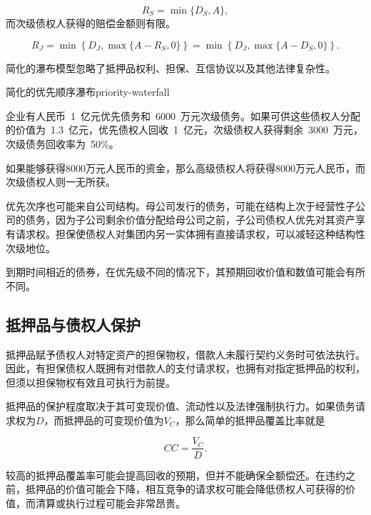 \begin{equation}
R_S=\min\{D_S,A\},
\label{eq:ch8-senior-recovery}
\end{equation}
而次级债权人获得的赔偿金额则有限。

\begin{equation}
R_J
=
\min\left\{D_J,\max\{A-R_S,0\}\right\}
=
\min\left\{D_J,\max\{A-D_S,0\}\right\}.
\label{eq:ch8-junior-recovery}
\end{equation}

简化的瀑布模型忽略了抵押品权利、担保、互信协议以及其他法律复杂性。

\begin{example}{简化的优先顺序瀑布}{priority-waterfall}

企业有人民币~1~亿元优先债务和~6000~万元次级债务。如果可供这些债权人分配的价值为~1.3~亿元，优先债权人回收~1~亿元，次级债权人获得剩余~3000~万元，次级债务回收率为~50\%。

如果能够获得8000万元人民币的资金，那么高级债权人将获得8000万元人民币，而次级债权人则一无所获。

\end{example}

优先次序也可能来自公司结构。母公司发行的债务，可能在结构上次于经营性子公司的债务，因为子公司剩余价值分配给母公司之前，子公司债权人优先对其资产享有请求权。担保使债权人对集团内另一实体拥有直接请求权，可以减轻这种结构性次级地位。

到期时间相近的债券，在优先级不同的情况下，其预期回收价值和数值可能会有所不同。

\subsection{抵押品与债权人保护}

抵押品赋予债权人对特定资产的担保物权，借款人未履行契约义务时可依法执行。因此，有担保债权人既拥有对借款人的支付请求权，也拥有对指定抵押品的权利，但须以担保物权有效且可执行为前提。

抵押品的保护程度取决于其可变现价值、流动性以及法律强制执行力。如果债务请求权为$D$，而抵押品的可变现价值为$V_C$，那么简单的抵押品覆盖比率就是

\begin{equation}
CC=\frac{V_C}{D}.
\label{eq:ch8-collateral-coverage}
\end{equation}

较高的抵押品覆盖率可能会提高回收的预期，但并不能确保全额偿还。在违约之前，抵押品的价值可能会下降，相互竞争的请求权可能会降低债权人可获得的价值，而清算或执行过程可能会非常昂贵。

